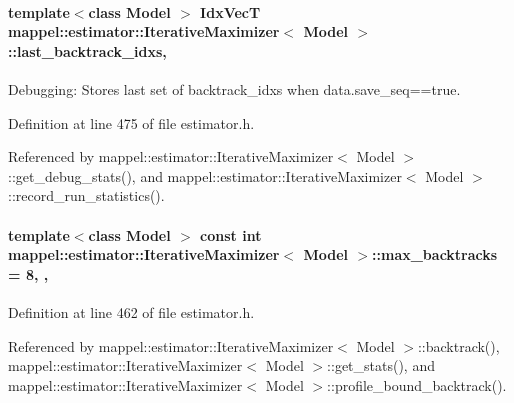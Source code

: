 \paragraph[{\texorpdfstring{last\+\_\+backtrack\+\_\+idxs}{last_backtrack_idxs}}]{\setlength{\rightskip}{0pt plus 5cm}template$<$class Model $>$ {\bf Idx\+VecT} {\bf mappel\+::estimator\+::\+Iterative\+Maximizer}$<$ Model $>$\+::last\+\_\+backtrack\+\_\+idxs\hspace{0.3cm}{\ttfamily [protected]}, {\ttfamily [inherited]}}\hypertarget{classmappel_1_1estimator_1_1IterativeMaximizer_aae10373b4dc244c435059bbc6b0d9704}{}\label{classmappel_1_1estimator_1_1IterativeMaximizer_aae10373b4dc244c435059bbc6b0d9704}


Debugging\+: Stores last set of backtrack\+\_\+idxs when data.\+save\+\_\+seq==true. 



Definition at line 475 of file estimator.\+h.



Referenced by mappel\+::estimator\+::\+Iterative\+Maximizer$<$ Model $>$\+::get\+\_\+debug\+\_\+stats(), and mappel\+::estimator\+::\+Iterative\+Maximizer$<$ Model $>$\+::record\+\_\+run\+\_\+statistics().

\paragraph[{\texorpdfstring{max\+\_\+backtracks}{max_backtracks}}]{\setlength{\rightskip}{0pt plus 5cm}template$<$class Model $>$ const int {\bf mappel\+::estimator\+::\+Iterative\+Maximizer}$<$ Model $>$\+::max\+\_\+backtracks = 8\hspace{0.3cm}{\ttfamily [static]}, {\ttfamily [protected]}, {\ttfamily [inherited]}}\hypertarget{classmappel_1_1estimator_1_1IterativeMaximizer_ac26f7b7965a26fa21f07732c3b1d727e}{}\label{classmappel_1_1estimator_1_1IterativeMaximizer_ac26f7b7965a26fa21f07732c3b1d727e}


Definition at line 462 of file estimator.\+h.



Referenced by mappel\+::estimator\+::\+Iterative\+Maximizer$<$ Model $>$\+::backtrack(), mappel\+::estimator\+::\+Iterative\+Maximizer$<$ Model $>$\+::get\+\_\+stats(), and mappel\+::estimator\+::\+Iterative\+Maximizer$<$ Model $>$\+::profile\+\_\+bound\+\_\+backtrack().

